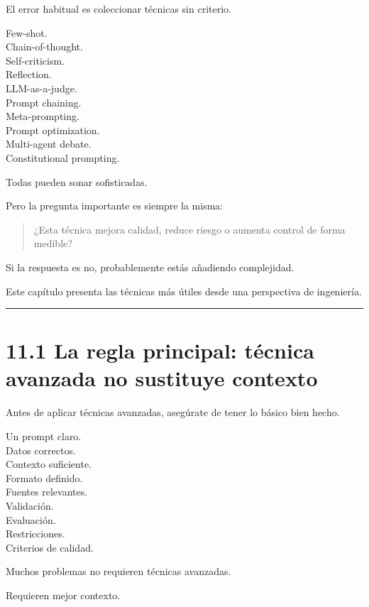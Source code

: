 El error habitual es coleccionar técnicas sin criterio.

Few-shot.\\
Chain-of-thought.\\
Self-criticism.\\
Reflection.\\
LLM-as-a-judge.\\
Prompt chaining.\\
Meta-prompting.\\
Prompt optimization.\\
Multi-agent debate.\\
Constitutional prompting.

Todas pueden sonar sofisticadas.

Pero la pregunta importante es siempre la misma:

\begin{quote}
¿Esta técnica mejora calidad, reduce riesgo o aumenta control de forma
medible?
\end{quote}

Si la respuesta es no, probablemente estás añadiendo complejidad.

Este capítulo presenta las técnicas más útiles desde una perspectiva de
ingeniería.

\begin{center}\rule{0.5\linewidth}{0.5pt}\end{center}

\section{11.1 La regla principal: técnica avanzada no sustituye
contexto}\label{la-regla-principal-tuxe9cnica-avanzada-no-sustituye-contexto}

Antes de aplicar técnicas avanzadas, asegúrate de tener lo básico bien
hecho.

Un prompt claro.\\
Datos correctos.\\
Contexto suficiente.\\
Formato definido.\\
Fuentes relevantes.\\
Validación.\\
Evaluación.\\
Restricciones.\\
Criterios de calidad.

Muchos problemas no requieren técnicas avanzadas.

Requieren mejor contexto.

